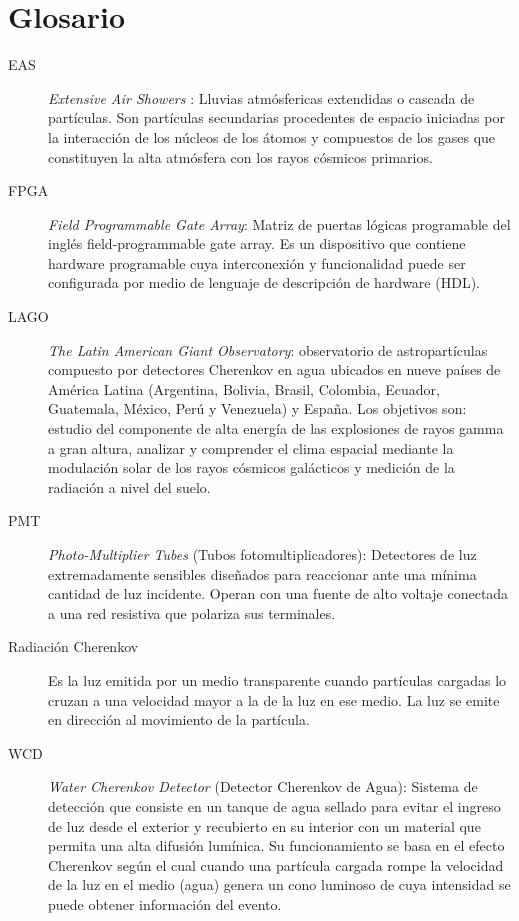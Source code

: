 \chapter*{Glosario}

\begin{description}
\item[EAS ] \textit{Extensive Air Showers} : Lluvias atmósfericas extendidas o cascada de partículas. Son partículas secundarias procedentes de espacio iniciadas por la interacción de los núcleos de los átomos y compuestos de los gases que constituyen la alta atmósfera con los rayos cósmicos primarios.

\item[FPGA] \textit{Field Programmable Gate Array}: Matriz de puertas lógicas programable del inglés field-programmable gate array. Es un dispositivo que contiene hardware programable cuya interconexión y funcionalidad puede ser configurada por medio de lenguaje de descripción de hardware (HDL).

\item[LAGO ] \textit{The Latin American Giant Observatory}: observatorio de astropartículas compuesto por detectores Cherenkov en agua ubicados en nueve países de América Latina (Argentina, Bolivia, Brasil, Colombia, Ecuador, Guatemala, México, Perú y Venezuela) y España.
Los objetivos son: estudio del componente de alta energía de las explosiones de rayos gamma a gran altura, analizar y comprender el clima espacial mediante la modulación solar de los rayos cósmicos galácticos y medición de la radiación a nivel del suelo.

\item[PMT] \textit{Photo-Multiplier Tubes} (Tubos fotomultiplicadores):
Detectores de luz extremadamente sensibles diseñados para reaccionar ante una mínima cantidad de luz incidente.
Operan con una fuente de alto voltaje conectada a una red resistiva que polariza sus terminales.
  
\item[Radiación Cherenkov ]
Es la luz emitida por un medio transparente cuando partículas cargadas lo cruzan a una velocidad mayor a la de la luz en ese medio.
La luz se emite en dirección al movimiento de la partícula.

\item[WCD] \textit{Water Cherenkov Detector} (Detector Cherenkov de Agua):
Sistema de detección que consiste en un tanque de agua sellado para evitar el ingreso de luz desde el exterior y recubierto en su interior con un material que permita una alta difusión lumínica. Su funcionamiento se basa en el efecto Cherenkov según el cual cuando una partícula cargada rompe la velocidad de la luz en el medio (agua) genera un cono luminoso de cuya intensidad se puede obtener información del evento.
  
\end{description}
